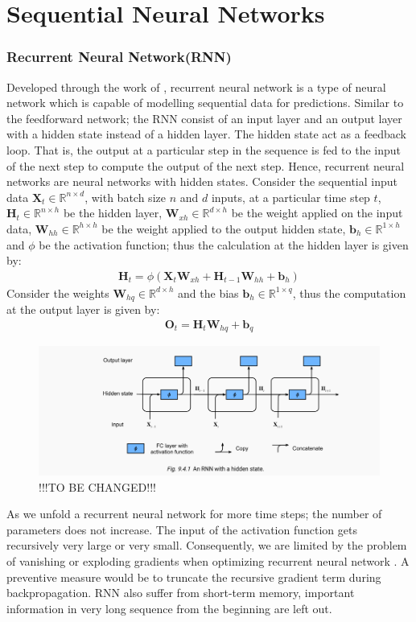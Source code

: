 \section{Sequential Neural Networks}
\subsubsection*{Recurrent Neural Network(RNN)}
Developed through the work of \cite{Rumelhart:1986aa}, recurrent neural network is a type of neural network which is capable of modelling sequential data for predictions. Similar to the feedforward network; the RNN consist of an input layer and  an output layer with a hidden state instead of a hidden layer. The hidden state act as a feedback loop. That is, the output at a particular step in the sequence is fed to the input of the next step to compute the output of the next step. Hence, recurrent neural networks are neural networks with hidden states. Consider the sequential input data $\mathbf{X}_t \in \mathbb{R}^{n \times d}$, with batch size $n$ and $d$ inputs, at a particular time step $t$, $\mathbf{H}_t \in \mathbb{R}^{n \times h}$ be the hidden layer, $\mathbf{W}_{xh}\in \mathbb{R}^{d \times h}$  be the weight applied on the input data, $\mathbf{W}_{hh}\in \mathbb{R}^{h \times h}$ be the weight applied to the output hidden state, $\mathbf{b}_h \in \mathbb{R}^{1 \times h}$ and $\phi$ be the activation function; thus the calculation at the hidden layer is given by:
\begin{align}
  \label{eq:RNN_HL}
  \mathbf{H}_t = \phi(\mathbf{X}_t \mathbf{W}_{xh} + \mathbf{H}_{t-1}\mathbf{W}_{hh} + \mathbf{b}_h)
\end{align}
Consider the weights $\mathbf{W}_{hq} \in \mathbb{R}^{d \times h}$ and the bias $\mathbf{b}_h \in \mathbb{R}^{1 \times q}$, thus the computation at the output layer is given by:
\begin{align}
  \label{eq:RNN_OL}
  \mathbf{O}_t = \mathbf{H}_t \mathbf{W}_{hq} + \mathbf{b}_q
\end{align}
\begin{figure}[ht]
  \centering
  \includegraphics[scale=0.4]{CHAPTER_2/c2_fig_RNN.png}
  \caption{!!!TO BE CHANGED!!!}
  \label{}
\end{figure}
As we unfold a recurrent neural network for more time steps; the number of parameters does not increase. The input of the activation function gets recursively very large or very small. Consequently, we are limited by the problem of vanishing or exploding gradients when optimizing recurrent neural network \cite{Bengio1994} \cite{Kolen2001}. A preventive measure would be to truncate the recursive gradient term during backpropagation. RNN also suffer from short-term memory, important information in very long sequence from the beginning are left out.
